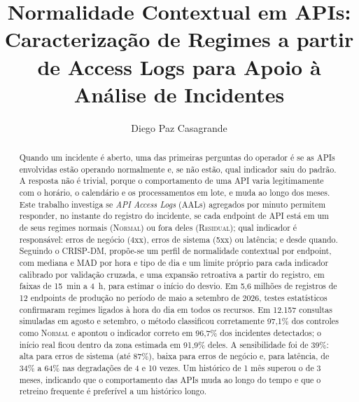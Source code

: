 \documentclass[sigconf,nonacm]{acmart}
\newcommand{\Normal}{\textsc{Normal}\xspace}
\newcommand{\Residual}{\textsc{Residual}\xspace}
\begin{document}
\title{Normalidade Contextual em APIs: Caracterização de Regimes a partir de Access Logs para Apoio à Análise de Incidentes}

\author{Diego Paz Casagrande}

\renewcommand{\shortauthors}{D. P. Casagrande}

\begin{abstract}
Quando um incidente é aberto, uma das primeiras perguntas do operador é se as APIs envolvidas estão operando normalmente e, se não estão, qual indicador saiu do padrão. A resposta não é trivial, porque o comportamento de uma API varia legitimamente com o horário, o calendário e os processamentos em lote, e muda ao longo dos meses. Este trabalho investiga se \emph{API Access Logs} (AALs) agregados por minuto permitem responder, no instante do registro do incidente, se cada endpoint de API está em um de seus regimes normais (\Normal) ou fora deles (\Residual); qual indicador é responsável: erros de negócio (4xx), erros de sistema (5xx) ou latência; e desde quando. Seguindo o CRISP-DM, propõe-se um perfil de normalidade contextual por endpoint, com mediana e MAD por hora e tipo de dia e um limite próprio para cada indicador calibrado por validação cruzada, e uma expansão retroativa a partir do registro, em faixas de 15~min a 4~h, para estimar o início do desvio. Em 5,6 milhões de registros de 12 endpoints de produção no período de maio a setembro de 2026, testes estatísticos confirmaram regimes ligados à hora do dia em todos os recursos. Em 12.157 consultas simuladas em agosto e setembro, o método classificou corretamente 97,1\% dos controles como \Normal e apontou o indicador correto em 96,7\% dos incidentes detectados; o início real ficou dentro da zona estimada em 91,9\% deles. A sensibilidade foi de 39\%: alta para erros de sistema (até 87\%), baixa para erros de negócio e, para latência, de 34\% a 64\% nas degradações de 4 e 10 vezes. Um histórico de 1 mês superou o de 3 meses, indicando que o comportamento das APIs muda ao longo do tempo e que o retreino frequente é preferível a um histórico longo.
\end{abstract}


\maketitle
\end{document}
